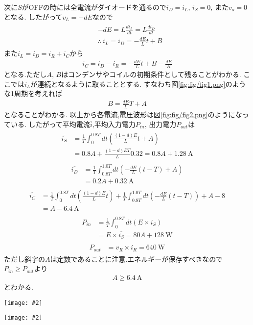 \documentclass[uplatex,a4j,11pt,dvipdfmx]{jsarticle}
\makeatletter
\def\fgcaption{\def\@captype{figure}\caption}
\newcommand{\mfig}[3][width=15cm]{
\begin{center}
\texttt{[image: \#2]}
\fgcaption{#3 \label{fig:#2}}
\end{center}
}
\makeatother
\begin{document}
次に$S$がOFFの時には全電流がダイオードを通るので$i_D=i_L$, $i_S=0$, また$v_o=0$となる.
したがって$v_L=-dE$なので
\begin{align}
  \begin{split}
    &-dE=L\frac{di_L}{dt}=L\frac{di_D}{dt}\\
    &\therefore\ i_L=i_D=-\frac{dE}{L}t+B
  \end{split}
\end{align}
また$i_L=i_D=i_R+i_C$から
\begin{align}
  i_C=i_D-i_R=-\frac{dE}{L}t+B-\frac{dE}{R}
\end{align}
となる.ただし$A$, $B$はコンデンサやコイルの初期条件として残ることがわかる.
ここでは$i_L$が連続となるように取ることとする.
すなわち図\ref{fig:fig/fig1.png}のような1周期を考えれば
\begin{align}
  B=\frac{dE}{L}T+A
\end{align}
となることがわかる.
以上から各電流,電圧波形は図\ref{fig:fig/fig2.png}のようになっている.
したがって平均電流$\overline{i}$,平均入力電力$P_{in}$, 出力電力$P_{out}$は
\begin{align}
  \begin{split}
    \overline{i_S}&=\frac{1}{T}\int_0^{0.8T}dt\left(\frac{(1-d)E}{L}t+A\right)\\
    &=0.8A+\frac{(1-d)ET}{L}0.32=0.8A+1.28\ \si{\ampere}
  \end{split}
\end{align}
\begin{align}
  \begin{split}
    \overline{i_D}&=\frac{1}{T}\int_{0.8T}^{1.0T}dt\left(-\frac{dE}{L}(t-T)+A\right)\\
    &=0.2A+0.32\ \si{\ampere}
  \end{split}
\end{align}
\begin{align}
  \begin{split}
    \overline{i_C}&=\frac{1}{T}\int_0^{0.8T}dt\left(\frac{(1-d)E}{L}t\right)+\frac{1}{T}\int_{0.8T}^{1.0T}dt\left(-\frac{dE}{L}(t-T)\right)+A-8\\
    &=A-6.4\ \si{\ampere}
  \end{split}
\end{align}
\begin{align}
  \begin{split}
    P_{in}&=\frac{1}{T}\int_0^{0.8T}dt\left(E\times i_S\right)\\
    &=E\times\overline{i_S}=80A+128\ \si{\watt}
  \end{split}
\end{align}
\begin{align}
  \begin{split}
    P_{out}&=v_R\times i_R=640\ \si{\watt}    
  \end{split}
\end{align}
ただし斜字の$A$は定数であることに注意.エネルギーが保存すべきなので$P_{in}\geq P_{out}$より
\begin{align}
  A\geq 6.4\ \si{\ampere}
\end{align}
とわかる.
\mfig[width=4cm]{fig/fig1.png}{$B$と$A$の関係の決定}
\mfig[width=10cm]{fig/fig2.png}{電流,電圧波形}
\end{document}
